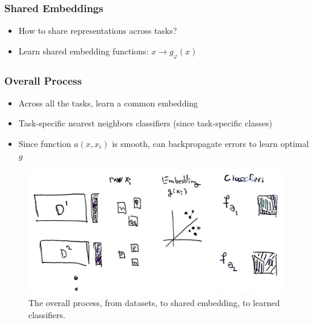 \documentclass[10pt,mathserif]{beamer}
\begin{document}
\begin{frame}
  \frametitle{Shared Embeddings}
 \begin{itemize}
 \item How to share representations across tasks? 
 \item Learn shared embedding functions: $x \rightarrow g_\varphi\left(x\right)$
 \end{itemize} 
\end{frame}

\begin{frame}
  \frametitle{Overall Process}
 \begin{itemize}
 \item  Across all the tasks, learn a common embedding
 \item Task-specific nearest neighbors classifiers (since task-specific classes)
 \item Since function $a\left(x, x_i\right)$ is smooth, can backpropagate errors
   to learn optimal $g$
 \end{itemize} 
\begin{figure}[ht]
  \centering
  \includegraphics[width=0.7\paperwidth]{figure/nn_full_process}
  \caption{The overall process, from datasets, to shared embedding, to learned
    classifiers. \label{fig:nn_full_process} }
\end{figure}
\end{frame}
\end{document}
